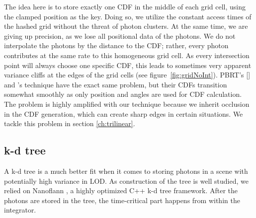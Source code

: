 The idea here is to store exactly one CDF in the middle of each grid cell, using the clamped position as the key. Doing so, we utilize the constant access times of the hashed grid without the threat of photon clusters. At the same time, we are giving up precision, as we lose all positional data of the photons. We do not interpolate the photons by the distance to the CDF; rather, every photon contributes at the same rate to this homogeneous grid cell. As every intersection point will always choose one specific CDF, this leads to sometimes very apparent variance cliffs at the edges of the grid cells (see figure~\ref{fig:gridNoInt}). PBRT's [\citeyear{pbrt}] and \textcite{Vevoda}'s technique have the exact same problem, but their CDFs transition somewhat smoothly as only position and angles are used for CDF calculation. The problem is highly amplified with our technique because we inherit occlusion in the CDF generation, which can create sharp edges in certain situations. We tackle this problem in section \ref{ch:trilinear}.


\subsection{k-d tree}
\label{sec:pneekdtree}

A k-d tree is a much better fit when it comes to storing photons in a scene with potentially high variance in LOD. As construction of the tree is well studied, we relied on Nanoflann \parencite{blanco2014nanoflann}, a highly optimized C++ k-d tree framework. After the photons are stored in the tree, the time-critical part happens from within the integrator. 

